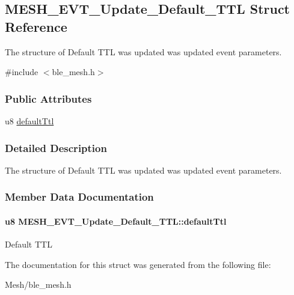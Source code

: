\hypertarget{struct_m_e_s_h___e_v_t___update___default___t_t_l}{}\subsection{M\+E\+S\+H\+\_\+\+E\+V\+T\+\_\+\+Update\+\_\+\+Default\+\_\+\+T\+TL Struct Reference}
\label{struct_m_e_s_h___e_v_t___update___default___t_t_l}


The structure of Default T\+TL was updated was updated event parameters.  




{\ttfamily \#include $<$ble\+\_\+mesh.\+h$>$}

\subsubsection*{Public Attributes}
\begin{DoxyCompactItemize}
\item 
u8 \hyperlink{struct_m_e_s_h___e_v_t___update___default___t_t_l_a95e7f425f4de43609f7b73dadc1aff36}{default\+Ttl}
\end{DoxyCompactItemize}


\subsubsection{Detailed Description}
The structure of Default T\+TL was updated was updated event parameters. 

\subsubsection{Member Data Documentation}
\paragraph[{\texorpdfstring{default\+Ttl}{defaultTtl}}]{\setlength{\rightskip}{0pt plus 5cm}u8 M\+E\+S\+H\+\_\+\+E\+V\+T\+\_\+\+Update\+\_\+\+Default\+\_\+\+T\+T\+L\+::default\+Ttl}\hypertarget{struct_m_e_s_h___e_v_t___update___default___t_t_l_a95e7f425f4de43609f7b73dadc1aff36}{}\label{struct_m_e_s_h___e_v_t___update___default___t_t_l_a95e7f425f4de43609f7b73dadc1aff36}
Default T\+TL 

The documentation for this struct was generated from the following file\+:\begin{DoxyCompactItemize}
\item 
Mesh/ble\+\_\+mesh.\+h\end{DoxyCompactItemize}
